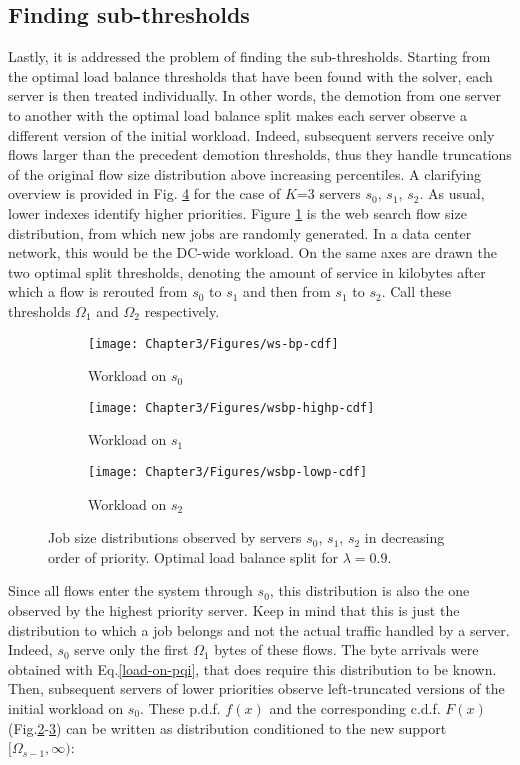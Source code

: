\subsection{Finding sub-thresholds}
\label{sec:subthresh-with-sd}
Lastly, it is addressed the problem of finding the sub-thresholds. Starting from the optimal load balance thresholds that have been found with the solver, each server is then treated individually. In other words, the demotion from one server to another with the optimal load balance split makes each server observe a different version of the initial workload. Indeed, subsequent servers receive only flows larger than the precedent demotion thresholds, thus they handle truncations of the original flow size distribution above increasing percentiles. A clarifying overview is provided in Fig. \ref{fig:sd-spine-distribution} for the case of $K$=3 servers $s_0$, $s_1$, $s_2$. As usual, lower indexes identify higher priorities. Figure \ref{fig:wsbp-cdf} is the web search flow size distribution, from which new jobs are randomly generated. In a data center network, this would be the DC-wide workload. On the same axes are drawn the two optimal split thresholds, denoting the amount of service in kilobytes after which a flow is rerouted from $s_0$ to $s_1$ and then from $s_1$ to $s_2$. Call these thresholds $\Omega_1$ and $\Omega_2$ respectively. 
\begin{figure}
	\centering
	\captionsetup{width=.8\linewidth}
	\begin{subfigure}{.3\textwidth}
		\centering
		\texttt{[image: Chapter3/Figures/ws-bp-cdf]}
		\caption{Workload on $s_0$}
		\label{fig:wsbp-cdf}
	\end{subfigure}%
	\hfill
	\begin{subfigure}{.3\textwidth}
		\centering
		\texttt{[image: Chapter3/Figures/wsbp-highp-cdf]}
		\caption{Workload on $s_1$}
		\label{fig:highp-cdf}
	\end{subfigure}
	\hfill
	\begin{subfigure}{.3\textwidth}
	\centering
	\texttt{[image: Chapter3/Figures/wsbp-lowp-cdf]}
	\caption{Workload on $s_2$}
	\label{fig:lowp-cdf}
	\end{subfigure}
	\caption{Job size distributions observed by servers $s_0$, $s_1$, $s_2$ in decreasing order of priority. Optimal load balance split for $\lambda=0.9$.}
	\label{fig:sd-spine-distribution}
\end{figure}
Since all flows enter the system through $s_0$, this distribution is also the one observed by the highest priority server. Keep in mind that this is just the distribution to which a job belongs and not the actual traffic handled by a server. Indeed, $s_0$ serve only the first $\Omega_1$ bytes of these flows. The byte arrivals were obtained with Eq.\eqref{load-on-pqi}, that does require this distribution to be known. Then, subsequent servers of lower priorities observe left-truncated versions of the initial workload on $s_0$. These p.d.f. $f(x)$ and the corresponding c.d.f. $F(x)$ (Fig.\ref{fig:highp-cdf}-\ref{fig:lowp-cdf}) can be written as distribution conditioned to the new support $[\Omega_{s-1},\infty)$:
